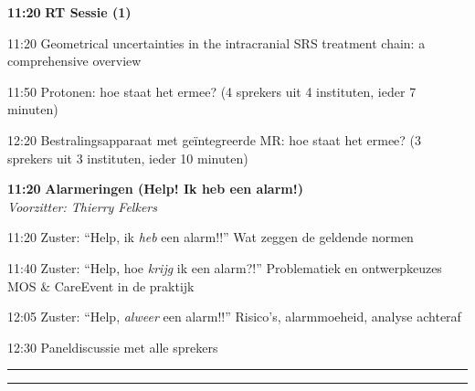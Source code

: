 \documentclass[a4paper,10pt]{report}
\begin{document}
\begin{multicols*}{3}
\begin{packed_enum}
\item[\textbf{11:20}] \textbf{RT Sessie (1)}
\item[11:20] Geometrical uncertainties in the intracranial SRS treatment chain: a comprehensive overview
\item[11:50] Protonen: hoe staat het ermee? (4 sprekers uit 4 instituten, ieder 7 minuten)
\item[12:20] Bestralingsapparaat met geïntegreerde MR: hoe staat het ermee? (3 sprekers uit 3 instituten, ieder 10 minuten)
\end{packed_enum} %

\vfill

\begin{packed_enum}
\item[\textbf{11:20}] \textbf{Alarmeringen (Help! Ik heb een alarm!)}\\\textit{Voorzitter: Thierry Felkers}
\item[11:20] Zuster: “Help, ik \textit{heb} een alarm!!” Wat zeggen de geldende normen
\item[11:40] Zuster: “Help, hoe \textit{krijg} ik een alarm?!” Problematiek en ontwerpkeuzes MOS \& CareEvent in de praktijk
\item[12:05] Zuster: “Help, \textit{alweer} een alarm!!” Risico’s, alarmmoeheid, analyse achteraf
\item[12:30] Paneldiscussie met alle sprekers
\end{packed_enum} %

\columnbreak

\hrule \vspace{2mm}
\vspace{2mm}\hrule\strut


\end{multicols*}
\end{document}
